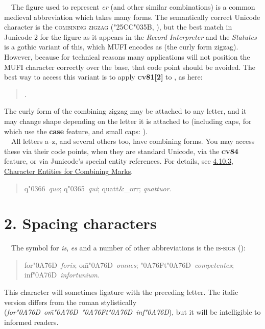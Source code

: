 \noindent{}\ \ The figure used to represent \textit{er\textup{ }}(and other similar combinations) is a common medieval
abbreviation which takes many forms. The semantically correct Unicode character is the \textsc{combining
zigzag} (\char"25CC\char"035B, ), but the best match in Junicode 2 for the figure as it appears in the
\textit{Record Interpreter} and the \textit{Statutes} is a gothic variant of this, which MUFI
encodes as  (the curly form zigzag). However, because for technical reasons many applications will not position
the MUFI character correctly over the base, that code point should be avoided. The best way to access this variant is
to apply \textsc{\textbf{cv81[2]}} to , as here:
\begin{quote}
.
\end{quote}
The curly form of the combining zigzag may be attached to any letter, and it may change shape depending on the letter it
is attached to (including caps, for which use the \textbf{case} feature, and small caps:
).\\[1ex]

\noindent{}\ \ All letters a--z, and several others too, have combining forms.
You may access these via their code points, when they are standard Unicode, via the
\textbf{\textsc{cv84}} feature, or via
Junicode's special entity references. For details, see \hyperlink{ss10}{4.10.3, Character Entities
for Combining Marks}.
\begin{quote}
q\char"0366\ \textit{quo}; q\char"0365\ \textit{qui}; quatt\&\_orr; \textit{quattuor}.
\end{quote}
\section{2. Spacing characters}
\ \ The symbol for \textit{is}, \textit{es} and a number of other abbreviations is the
\textsc{is-sign} ():
\begin{quote}
for\char"0A76D\ \textit{foris}; o\={m}\char"0A76D\ \textit{omnes}; \char"0A76Ft\char"0A76D\
\textit{competentes}; inf\char"0A76D\ \textit{infortunium}.
\end{quote}
This character will sometimes ligature with the preceding letter. The italic version differs from the roman
stylistically (\textit{for\char"0A76D\ o\={m}\char"0A76D\ \char"0A76Ft\char"0A76D\ inf\char"0A76D}), but it will be
intelligible to informed readers.\\[1ex]

